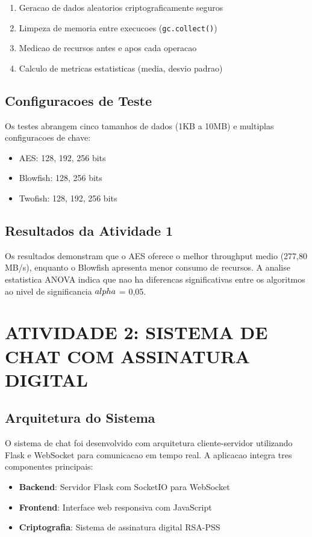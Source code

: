 \documentclass[12pt,a4paper,oneside]{article}
\begin{document}
\begin{enumerate}
    \item Geracao de dados aleatorios criptograficamente seguros
    \item Limpeza de memoria entre execucoes (\texttt{gc.collect()})
    \item Medicao de recursos antes e apos cada operacao
    \item Calculo de metricas estatisticas (media, desvio padrao)
\end{enumerate}

\subsection{Configuracoes de Teste}

Os testes abrangem cinco tamanhos de dados (1KB a 10MB) e multiplas configuracoes de chave:
\begin{itemize}
    \item AES: 128, 192, 256 bits
    \item Blowfish: 128, 256 bits
    \item Twofish: 128, 192, 256 bits
\end{itemize}

\subsection{Resultados da Atividade 1}

Os resultados demonstram que o AES oferece o melhor throughput medio (277,80 MB/s), enquanto o Blowfish apresenta menor consumo de recursos. A analise estatistica ANOVA indica que nao ha diferencas significativas entre os algoritmos ao nivel de significancia $\\alpha$ = 0,05.

\section{ATIVIDADE 2: SISTEMA DE CHAT COM ASSINATURA DIGITAL}

\subsection{Arquitetura do Sistema}

O sistema de chat foi desenvolvido com arquitetura cliente-servidor utilizando Flask e WebSocket para comunicacao em tempo real. A aplicacao integra tres componentes principais:

\begin{itemize}
    \item \textbf{Backend}: Servidor Flask com SocketIO para WebSocket
    \item \textbf{Frontend}: Interface web responsiva com JavaScript
    \item \textbf{Criptografia}: Sistema de assinatura digital RSA-PSS
\end{itemize}
\end{document}
